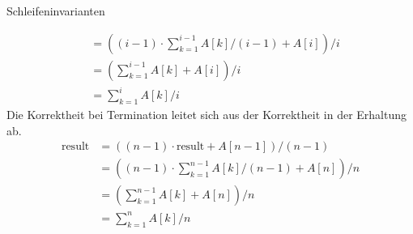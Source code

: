 \documentclass{article}
\begin{document}
\begin{exercise}{Schleifeninvarianten}
\begin{solution}
\begin{enumerate}
{\begin{align*}
                              & = ((i-1)\cdot\sum_{k=1}^{i-1} A[k]/(i-1) + A[i])/i \\
                              & = (\sum_{k=1}^{i-1} A[k] + A[i])/i                 \\
                              & = \sum_{k=1}^{i} A[k]/i
              \end{align*}
            }{
              Die Korrektheit bei Termination leitet sich aus der Korrektheit in der Erhaltung ab.
              \begin{align*}
                \text{result} & = ((n-1)\cdot \text{result} + A[n-1])/(n-1)        \\
                              & = ((n-1)\cdot\sum_{k=1}^{n-1} A[k]/(n-1) + A[n])/n \\
                              & = (\sum_{k=1}^{n-1} A[k] + A[n])/n                 \\
                              & = \sum_{k=1}^{n} A[k]/n
              \end{align*}
            }
    \end{enumerate}
  \end{solution}
\end{exercise}
\end{document}
